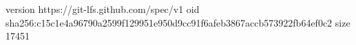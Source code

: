 version https://git-lfs.github.com/spec/v1
oid sha256:c15c1e4a96790a2599f129951e950d9cc91f6afeb3867accb573922fb64ef0c2
size 17451
